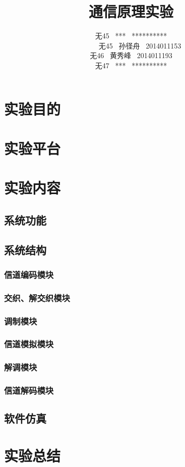 \documentclass[UTF8]{ctexart}
\date{}
\title{\textbf{通信原理实验}}
\author{无45 \ *** \ **********\\
        无45 \ 孙径舟 \ 2014011153\\
        无46 \ 黄秀峰 \ 2014011193\\
        无47 \ *** \ **********}
\begin{document}
\maketitle

\section{实验目的}

\section{实验平台}

\section{实验内容}

\subsection{系统功能}

\subsection{系统结构}

\subsubsection{信道编码模块}


\subsubsection{交织、解交织模块}


\subsubsection{调制模块}

\subsubsection{信道模拟模块}

\subsubsection{解调模块}

\subsubsection{信道解码模块}


\subsection{软件仿真}


\section{实验总结}

\end{document}
